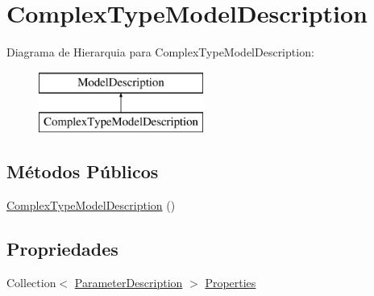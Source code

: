 \hypertarget{classApi3Layers_1_1Areas_1_1HelpPage_1_1ModelDescriptions_1_1ComplexTypeModelDescription}{}\section{Complex\+Type\+Model\+Description}
\label{classApi3Layers_1_1Areas_1_1HelpPage_1_1ModelDescriptions_1_1ComplexTypeModelDescription}
Diagrama de Hierarquia para Complex\+Type\+Model\+Description\+:\begin{figure}[H]
\begin{center}
\leavevmode
\includegraphics[height=2.000000cm]{df/ddb/classApi3Layers_1_1Areas_1_1HelpPage_1_1ModelDescriptions_1_1ComplexTypeModelDescription}
\end{center}
\end{figure}
\subsection*{Métodos Públicos}
\begin{DoxyCompactItemize}
\item 
\hyperlink{classApi3Layers_1_1Areas_1_1HelpPage_1_1ModelDescriptions_1_1ComplexTypeModelDescription_a81a0cc465616fd3a2f00f1295fafcb78}{Complex\+Type\+Model\+Description} ()
\end{DoxyCompactItemize}
\subsection*{Propriedades}
\begin{DoxyCompactItemize}
\item 
Collection$<$ \hyperlink{classApi3Layers_1_1Areas_1_1HelpPage_1_1ModelDescriptions_1_1ParameterDescription}{Parameter\+Description} $>$ \hyperlink{classApi3Layers_1_1Areas_1_1HelpPage_1_1ModelDescriptions_1_1ComplexTypeModelDescription_adc2966acc96bfe491b21fec063855b8c}{Properties}
\end{DoxyCompactItemize}


